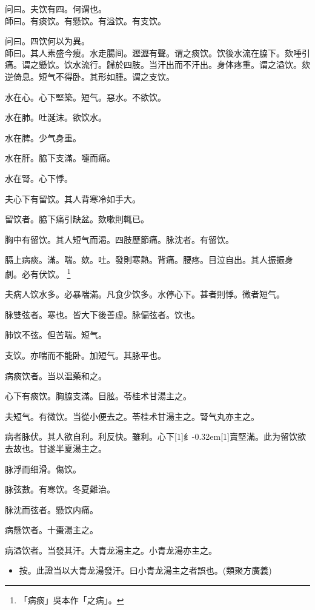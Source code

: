 \documentclass[oneside,b4paper]{ctexbook}
\begin{document}
\begin{flushleft}
问曰。夫饮有四。何谓也。\\
師曰。有痰饮。有懸饮。有溢饮。有支饮。

问曰。四饮何以为異。\\
師曰。其人素盛今瘦。水走腸间。瀝瀝有聲。谓之痰饮。饮後水流在脇下。欬唾引痛。谓之懸饮。饮水流行。歸於四肢。当汗出而不汗出。身体疼重。谓之溢饮。欬逆倚息。短气不得卧。其形如腫。谓之支饮。

水在心。心下堅築。短气。惡水。不欲饮。

水在肺。吐涎沫。欲饮水。

水在脾。少气身重。

水在肝。脇下支滿。嚏而痛。

水在腎。心下悸。

夫心下有留饮。其人背寒冷如手大。

留饮者。脇下痛引缺盆。欬嗽則輒已。

胸中有留饮。其人短气而渴。四肢歷節痛。脉沈者。有留饮。

膈上病痰。滿。喘。欬。吐。發則寒熱。背痛。腰疼。目泣自出。其人振振身{𥆧}劇。必有伏饮。
\footnote{「病痰」吳本作「之病」。}

夫病人饮水多。必暴喘滿。凡食少饮多。水停心下。甚者則悸。微者短气。

脉雙弦者。寒也。皆大下後善虛。脉偏弦者。饮也。

肺饮不弦。但苦喘。短气。

支饮。亦喘而不能卧。加短气。其脉平也。

病痰饮者。当以温藥和之。

心下有痰饮。胸脇支滿。目胘。苓桂术甘湯主之。

夫短气。有微饮。当從小便去之。苓桂术甘湯主之。腎气丸亦主之。

病者脉伏。其人欲自利。利反快。雖利。心下{\hbox{\scalebox{0.6}[1]{纟}\kern-0.32em\scalebox{0.7}[1]{賣}}}堅滿。此为留饮欲去故也。甘遂半夏湯主之。

脉浮而细滑。傷饮。

脉弦數。有寒饮。冬夏難治。

脉沈而弦者。懸饮内痛。

病懸饮者。十棗湯主之。

病溢饮者。当發其汗。大青龙湯主之。小青龙湯亦主之。

\begin{itemize}
\item 按。此證当以大青龙湯發汗。曰小青龙湯主之者誤也。(類聚方廣義)
\end{itemize}


\end{flushleft}
\end{document}
